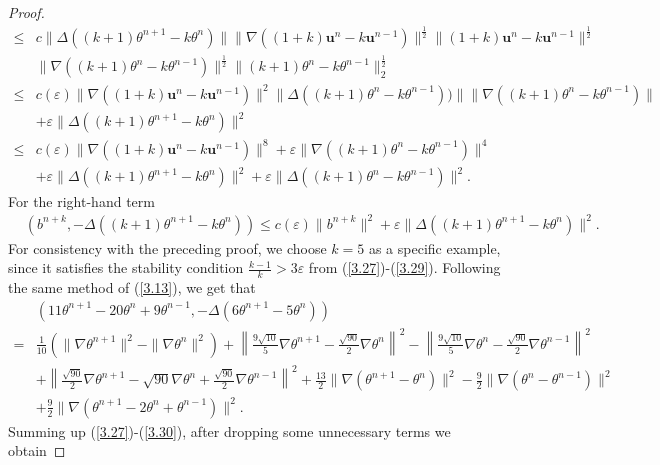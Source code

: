 \documentclass[10pt]{article}
\begin{document}
\begin{proof}
{\begin{align}
			\leq & c\|\Delta((k+1)\theta^{n+1}-k\theta^n)\|\|\nabla((1+k)\bm{u}^n-k\bm{u}^{n-1})\|^{\frac{1}{2}}\|(1+k)\bm{u}^n-k\bm{u}^{n-1}\|^\frac{1}{2}\nonumber\\
			&  \|\nabla((k+1)\theta^{n} - k\theta^{n-1})\|^\frac{1}{2}\|(k+1)\theta^{n} - k\theta^{n-1}\|^\frac{1}{2}_2\nonumber\\
			\leq & c(\varepsilon)\|\nabla((1+k)\bm{u}^n-k\bm{u}^{n-1})\|^2\|\Delta((k+1)\theta^{n} - k\theta^{n-1}))\|\|\nabla((k+1)\theta^{n} - k\theta^{n-1})\|\nonumber\\
			&  +\varepsilon\|\Delta((k+1)\theta^{n+1}-k\theta^n)\|^2\nonumber\\
			\leq & c(\varepsilon)\|\nabla((1+k)\bm{u}^n-k\bm{u}^{n-1})\|^8+\varepsilon\|\nabla((k+1)\theta^{n} - k\theta^{n-1})\|^4\nonumber\\
			&  +\varepsilon\|\Delta((k+1)\theta^{n+1}-k\theta^n)\|^2+\varepsilon\|\Delta((k+1)\theta^{n} - k\theta^{n-1})\|^2.
		\end{align}}
		For the right-hand term
		\begin{align}\label{3.29}
			&(b^{n+k},-\Delta((k+1)\theta^{n+1}-k\theta^n))\leq c(\varepsilon)\|b^{n+k}\|^2+\varepsilon\|\Delta((k+1)\theta^{n+1}-k\theta^n)\|^2.
		\end{align}
		For consistency with the preceding proof, we choose \(k = 5\) as a specific example, since it satisfies the stability condition \(\frac{k-1}{k} > 3\varepsilon\)  from (\ref{3.27})-(\ref{3.29}).  Following the same method of  (\ref{3.13}), we get that
		\begin{align}\label{3.30}
			&(11\theta^{n+1} - 20\theta^n + 9\theta^{n-1}, -\Delta(6\theta^{n+1} - 5\theta^n)) \nonumber\\
			=& \frac{1}{10} \left( \|\nabla \theta^{n+1}\|^2 - \|\nabla \theta^n\|^2 \right) + \left\| \frac{9\sqrt{10}}{5} \nabla \theta^{n+1} - \frac{\sqrt{90}}{2} \nabla \theta^n \right\|^2 - \left\| \frac{9\sqrt{10}}{5} \nabla \theta^n - \frac{\sqrt{90}}{2} \nabla \theta^{n-1} \right\|^2 	\nonumber\\
			&  + \left\| \frac{\sqrt{90}}{2} \nabla \theta^{n+1} - \sqrt{90} \nabla \theta^n + \frac{\sqrt{90}}{2} \nabla \theta^{n-1} \right\|^2 + \frac{13}{2} \|\nabla(\theta^{n+1} - \theta^n)\|^2 - \frac{9}{2} \|\nabla(\theta^n - \theta^{n-1})\|^2\nonumber\\	
			&   + \frac{9}{2} \|\nabla(\theta^{n+1} - 2\theta^n + \theta^{n-1})\|^2.
		\end{align}
		Summing up (\ref{3.27})-(\ref{3.30}), after dropping some unnecessary terms we obtain

\end{proof}
\end{document}
